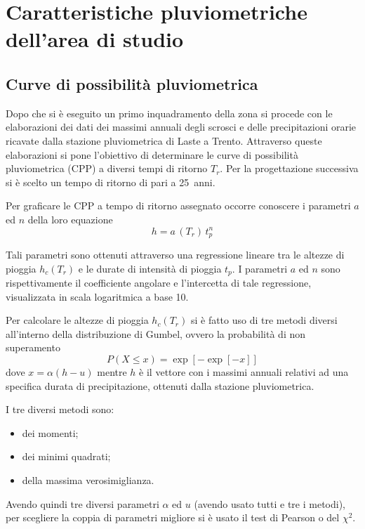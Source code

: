 \chapter{Caratteristiche pluviometriche dell’area di studio}\label{cap:pluviometriche}
\section{Curve di possibilità pluviometrica}
Dopo che si è eseguito un primo inquadramento della zona si procede con le elaborazioni dei dati dei massimi annuali degli scrosci e delle precipitazioni orarie ricavate dalla stazione pluviometrica di Laste a Trento.
Attraverso queste elaborazioni si pone l'obiettivo di determinare le curve di possibilità pluviometrica (CPP) a diversi tempi di ritorno $T_r$.
Per la progettazione successiva si è scelto un tempo di ritorno di pari a \SI{25}{anni}. 

Per graficare le CPP a tempo di ritorno assegnato occorre conoscere i parametri $a$ ed $n$ della loro equazione
\begin{equation}
    h = a\,(T_r) \, t_p ^{n}
\end{equation}

Tali parametri sono ottenuti attraverso una regressione lineare tra le altezze di pioggia $h_c (T_r)$ e le durate di intensità di pioggia $t_p$. 
I parametri $a$ ed $n$ sono rispettivamente il coefficiente angolare e l'intercetta di tale regressione, visualizzata in scala logaritmica a base 10. 

Per calcolare le altezze di pioggia $h_c (T_r)$ si è fatto uso di tre metodi diversi all'interno della distribuzione di Gumbel, ovvero la probabilità di non superamento 
\begin{equation}
  P(X\leq x) = \exp{\left[-\exp{\left[-x \right]} \right]}
\end{equation}
 dove $x = \alpha ( h - u)$ mentre $h$ è il vettore con i massimi annuali relativi ad una specifica durata di precipitazione, ottenuti dalla stazione pluviometrica.

I tre diversi metodi sono:
\begin{itemize}
\item dei momenti;
\item dei minimi quadrati;
\item della massima verosimiglianza.
\end{itemize}
Avendo quindi tre diversi parametri $\alpha$ ed $u$ (avendo usato tutti e tre i metodi), per scegliere la coppia di parametri migliore si è usato il test di Pearson o del $\chi ^2$.

